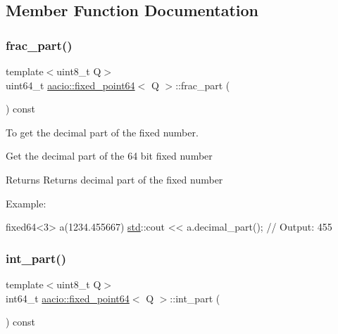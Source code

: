 \subsection{Member Function Documentation}
\mbox{\label{structaacio_1_1fixed__point64_a1b88ef06a8be1383983402df798e295a}} 
\subsubsection{\texorpdfstring{frac\+\_\+part()}{frac\_part()}}
{\footnotesize\ttfamily template$<$uint8\+\_\+t Q$>$ \\
uint64\+\_\+t \mbox{\hyperlink{structaacio_1_1fixed__point64}{aacio\+::fixed\+\_\+point64}}$<$ Q $>$\+::frac\+\_\+part (\begin{DoxyParamCaption}{ }\end{DoxyParamCaption}) const\hspace{0.3cm}{\ttfamily [inline]}}



To get the decimal part of the fixed number. 

Get the decimal part of the 64 bit fixed number \begin{DoxyReturn}{Returns}
Returns decimal part of the fixed number
\end{DoxyReturn}
Example\+: 
\begin{DoxyCode}
fixed64<3> a(1234.455667)
\mbox{\hyperlink{namespacestd}{std}}::cout << a.decimal\_part(); \textcolor{comment}{// Output: 455}
\end{DoxyCode}
 \mbox{\label{structaacio_1_1fixed__point64_a674a0fb3a852c50dedfb2c167113447d}} 
\subsubsection{\texorpdfstring{int\+\_\+part()}{int\_part()}}
{\footnotesize\ttfamily template$<$uint8\+\_\+t Q$>$ \\
int64\+\_\+t \mbox{\hyperlink{structaacio_1_1fixed__point64}{aacio\+::fixed\+\_\+point64}}$<$ Q $>$\+::int\+\_\+part (\begin{DoxyParamCaption}{ }\end{DoxyParamCaption}) const\hspace{0.3cm}{\ttfamily [inline]}}



